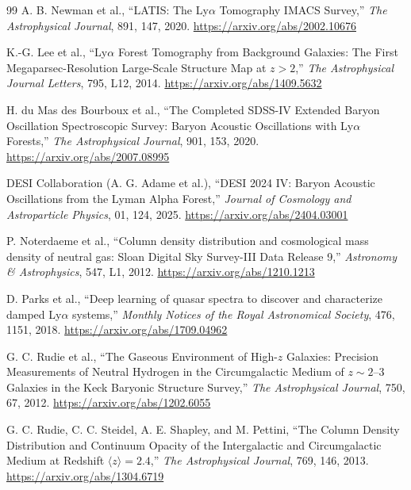 \begin{thebibliography}{99}
A. B. Newman et al.,
``LATIS: The Ly$\alpha$ Tomography IMACS Survey,''
\emph{The Astrophysical Journal}, 891, 147, 2020.
\url{https://arxiv.org/abs/2002.10676}

K.-G. Lee et al.,
``Ly$\alpha$ Forest Tomography from Background Galaxies: The First Megaparsec-Resolution Large-Scale Structure Map at $z>2$,''
\emph{The Astrophysical Journal Letters}, 795, L12, 2014.
\url{https://arxiv.org/abs/1409.5632}

H. du Mas des Bourboux et al.,
``The Completed SDSS-IV Extended Baryon Oscillation Spectroscopic Survey: Baryon Acoustic Oscillations with Ly$\alpha$ Forests,''
\emph{The Astrophysical Journal}, 901, 153, 2020.
\url{https://arxiv.org/abs/2007.08995}

DESI Collaboration (A. G. Adame et al.),
``DESI 2024 IV: Baryon Acoustic Oscillations from the Lyman Alpha Forest,''
\emph{Journal of Cosmology and Astroparticle Physics}, 01, 124, 2025.
\url{https://arxiv.org/abs/2404.03001}

P. Noterdaeme et al.,
``Column density distribution and cosmological mass density of neutral gas: Sloan Digital Sky Survey-III Data Release 9,''
\emph{Astronomy \& Astrophysics}, 547, L1, 2012.
\url{https://arxiv.org/abs/1210.1213}

D. Parks et al.,
``Deep learning of quasar spectra to discover and characterize damped Ly$\alpha$ systems,''
\emph{Monthly Notices of the Royal Astronomical Society}, 476, 1151, 2018.
\url{https://arxiv.org/abs/1709.04962}

G. C. Rudie et al.,
``The Gaseous Environment of High-$z$ Galaxies: Precision Measurements of Neutral Hydrogen in the Circumgalactic Medium of $z\sim2$--$3$ Galaxies in the Keck Baryonic Structure Survey,''
\emph{The Astrophysical Journal}, 750, 67, 2012.
\url{https://arxiv.org/abs/1202.6055}

G. C. Rudie, C. C. Steidel, A. E. Shapley, and M. Pettini,
``The Column Density Distribution and Continuum Opacity of the Intergalactic and Circumgalactic Medium at Redshift $\langle z\rangle=2.4$,''
\emph{The Astrophysical Journal}, 769, 146, 2013.
\url{https://arxiv.org/abs/1304.6719}


\end{thebibliography}
